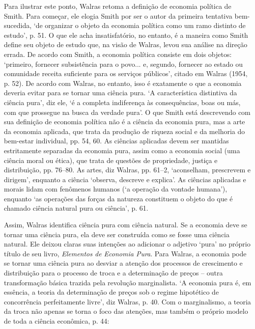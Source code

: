 \documentclass[12pt]{article}
\begin{document}
Para ilustrar este ponto, Walras retoma a definição de economia política de Smith. Para começar, ele elogia Smith por ser o autor da primeira tentativa bem-sucedida, ‘de organizar o objeto da economia política como um ramo distinto de estudo’, p. 51. O que ele acha insatisfatório, no entanto, é a maneira como Smith define seu objeto de estudo que, na visão de Walras, levou sua análise na direção errada. De acordo com Smith, a economia política consiste em dois objetos: ‘primeiro, fornecer subsistência para o povo... e, segundo, fornecer ao estado ou comunidade receita suficiente para os serviços públicos’, citado em Walras (1954, p. 52). De acordo com Walras, no entanto, isso é exatamente o que a economia deveria evitar para se tornar uma ciência pura. ‘A característica distintiva da ciência pura’, diz ele, ‘é a completa indiferença às consequências, boas ou más, com que prossegue na busca da verdade pura’. O que Smith está descrevendo com sua definição de economia política não é a ciência da economia pura, mas a arte da economia aplicada, que trata da produção de riqueza social e da melhoria do bem-estar individual, pp. 54, 60. As ciências aplicadas devem ser mantidas estritamente separadas da economia pura, assim como a economia social (uma ciência moral ou ética), que trata de questões de propriedade, justiça e distribuição, pp. 76–80. As artes, diz Walras, pp. 61–2, ‘aconselham, prescrevem e dirigem’, enquanto a ciência ‘observa, descreve e explica’. As ciências aplicadas e morais lidam com fenômenos humanos (‘a operação da vontade humana’), enquanto ‘as operações das forças da natureza constituem o objeto do que é chamado ciência natural pura ou ciência’, p. 61.

Assim, Walras identifica ciência pura com ciência natural. Se a economia deve se tornar uma ciência pura, ela deve ser construída como se fosse uma ciência natural. Ele deixou claras suas intenções ao adicionar o adjetivo ‘pura’ no próprio título de seu livro, \textit{Elementos de Economia Pura}. Para Walras, a economia pode se tornar uma ciência pura ao desviar a atenção dos processos de crescimento e distribuição para o processo de troca e a determinação de preços – outra transformação básica trazida pela revolução marginalista. ‘A economia pura é, em essência, a teoria da determinação de preços sob o regime hipotético de concorrência perfeitamente livre’, diz Walras, p. 40. Com o marginalismo, a teoria da troca não apenas se torna o foco das atenções, mas também o próprio modelo de toda a ciência econômica, p. 44:
\end{document}
